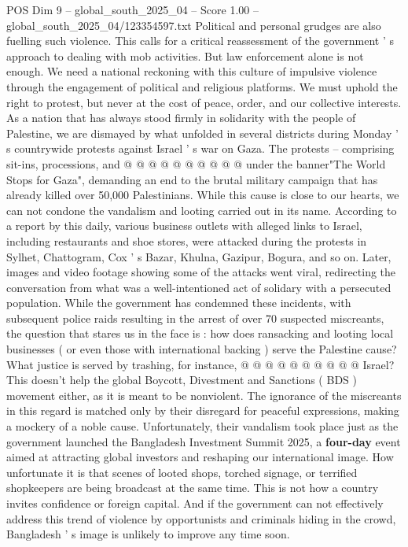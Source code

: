 \begin{textsample}{POS Dim 9 – global\_south\_2025\_04 – Score 1.00 – global\_south\_2025\_04/123354597.txt}
Political and personal grudges are also fuelling such violence.
This calls for a critical reassessment of the government ' s approach to dealing with mob activities.
But law enforcement alone is not enough.
We need a national reckoning with this culture of impulsive violence through the engagement of political and religious platforms.
We must uphold the right to protest, but never at the cost of peace, order, and our collective interests.
As a nation that has always stood firmly in solidarity with the people of Palestine, we are dismayed by what unfolded in several districts during Monday ' s countrywide protests against Israel ' s war on Gaza.
The protests -- comprising sit-ins, processions, and @ @ @ @ @ @ @ @ @ @ under the banner"The World Stops for Gaza", demanding an end to the brutal military campaign that has already killed over 50,000 Palestinians.
While this cause is close to our hearts, we can not condone the vandalism and looting carried out in its name.
According to a report by this daily, various business outlets with alleged links to Israel, including restaurants and shoe stores, were attacked during the protests in Sylhet, Chattogram, Cox ' s Bazar, Khulna, Gazipur, Bogura, and so on.
Later, images and video footage showing some of the attacks went viral, redirecting the conversation from what was a well-intentioned act of solidary with a persecuted population.
While the government has condemned these incidents, with subsequent police raids resulting in the arrest of over 70 suspected miscreants, the question that stares us in the face is : how does ransacking and looting local businesses ( or even those with international backing ) serve the Palestine cause?
What justice is served by trashing, for instance, @ @ @ @ @ @ @ @ @ @ Israel?
This doesn't help the global Boycott, Divestment and Sanctions ( BDS ) movement either, as it is meant to be nonviolent.
The ignorance of the miscreants in this regard is matched only by their disregard for peaceful expressions, making a mockery of a noble cause.
Unfortunately, their vandalism took place just as the government launched the Bangladesh Investment Summit 2025, a \textbf{four-day} event aimed at attracting global investors and reshaping our international image.
How unfortunate it is that scenes of looted shops, torched signage, or terrified shopkeepers are being broadcast at the same time.
This is not how a country invites confidence or foreign capital.
And if the government can not effectively address this trend of violence by opportunists and criminals hiding in the crowd, Bangladesh ' s image is unlikely to improve any time soon.

\end{textsample}
